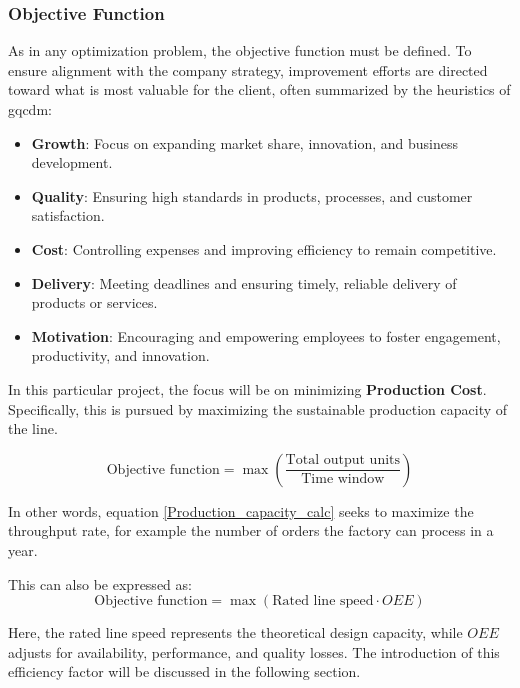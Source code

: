 \documentclass[]{article}
\begin{document}
\subsubsection{Objective Function}
As in any optimization problem, the objective function must be defined. 
To ensure alignment with the company strategy, improvement efforts are directed toward what is most valuable for the client, often summarized by the heuristics of \gls{gqcdm}:
  \begin{itemize}
    \item \textbf{Growth}: Focus on expanding market share, innovation, and business development.
    \item \textbf{Quality}: Ensuring high standards in products, processes, and customer satisfaction.
    \item \textbf{Cost}: Controlling expenses and improving efficiency to remain competitive.
    \item \textbf{Delivery}: Meeting deadlines and ensuring timely, reliable delivery of products or services.
    \item \textbf{Motivation}: Encouraging and empowering employees to foster engagement, productivity, and innovation.
  \end{itemize}

  In this particular project, the focus will be on minimizing \textbf{Production Cost}. 
Specifically, this is pursued by maximizing the sustainable production capacity of the line.

\begin{equation}\label{Production_capacity_calc}
   \text{Objective function} = \max \left( \frac{\text{Total output units}}{\text{Time window}} \right)
\end{equation}

In other words, equation \ref{Production_capacity_calc} seeks to maximize the throughput rate, for example the number of orders the factory can process in a year.

This can also be expressed as:
\begin{equation}\label{eq:production_capacity_calc_OEE}
   \text{Objective function} = \max \left( \text{Rated line speed} \cdot OEE \right)
\end{equation}

Here, the rated line speed represents the theoretical design capacity, while $OEE$ adjusts for availability, performance, and quality losses. 
The introduction of this efficiency factor will be discussed in the following section.
\end{document}
